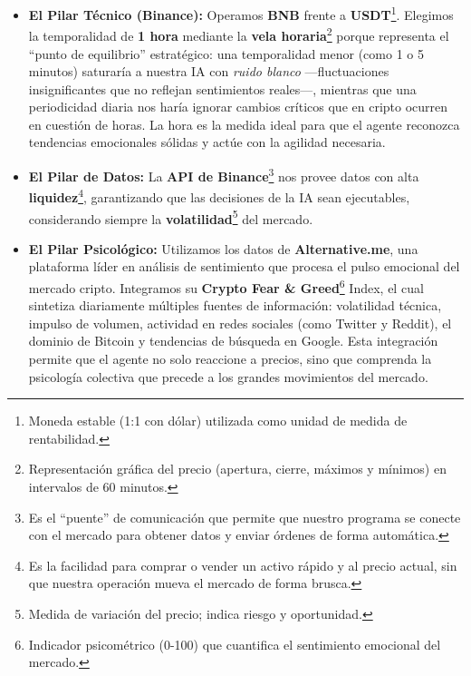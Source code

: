 \documentclass[12pt,a4paper]{article}
\begin{document}
\begin{itemize}
    \item \textbf{El Pilar Técnico (Binance):} Operamos \textbf{BNB} frente a \textbf{USDT}\footnote{Moneda estable (1:1 con dólar) utilizada como unidad de medida de rentabilidad.}. Elegimos la temporalidad de \textbf{1 hora} mediante la \textbf{vela horaria}\footnote{Representación gráfica del precio (apertura, cierre, máximos y mínimos) en intervalos de 60 minutos.} porque representa el ``punto de equilibrio'' estratégico: una temporalidad menor (como 1 o 5 minutos) saturaría a nuestra IA con \textit{ruido blanco} ---fluctuaciones insignificantes que no reflejan sentimientos reales---, mientras que una periodicidad diaria nos haría ignorar cambios críticos que en cripto ocurren en cuestión de horas. La hora es la medida ideal para que el agente reconozca tendencias emocionales sólidas y actúe con la agilidad necesaria.
    
    \item \textbf{El Pilar de Datos:} La \textbf{API de Binance}\footnote{Es el ``puente'' de comunicación que permite que nuestro programa se conecte con el mercado para obtener datos y enviar órdenes de forma automática.} nos provee datos con alta \textbf{liquidez}\footnote{Es la facilidad para comprar o vender un activo rápido y al precio actual, sin que nuestra operación mueva el mercado de forma brusca.}, garantizando que las decisiones de la IA sean ejecutables, considerando siempre la \textbf{volatilidad}\footnote{Medida de variación del precio; indica riesgo y oportunidad.} del mercado.

    \item \textbf{El Pilar Psicológico:} Utilizamos los datos de \textbf{Alternative.me}, una plataforma líder en análisis de sentimiento que procesa el pulso emocional del mercado cripto. Integramos su \textbf{Crypto Fear \& Greed}\footnote{Indicador psicométrico (0-100) que cuantifica el sentimiento emocional del mercado.} Index, el cual sintetiza diariamente múltiples fuentes de información: volatilidad técnica, impulso de volumen, actividad en redes sociales (como Twitter y Reddit), el dominio de Bitcoin y tendencias de búsqueda en Google. Esta integración permite que el agente no solo reaccione a precios, sino que comprenda la psicología colectiva que precede a los grandes movimientos del mercado.
\end{itemize}
\end{document}
